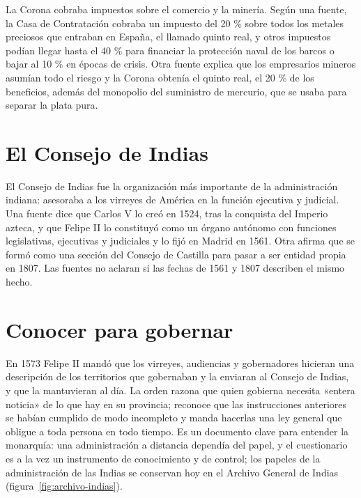 \documentclass{book}
\begin{document}

La Corona cobraba impuestos sobre el comercio y la minería. Según una fuente, la Casa de Contratación cobraba un impuesto del 20 \% sobre todos los metales preciosos que entraban en España, el llamado quinto real, y otros impuestos podían llegar hasta el 40 \% para financiar la protección naval de los barcos o bajar al 10 \% en épocas de crisis. Otra fuente explica que los empresarios mineros asumían todo el riesgo y la Corona obtenía el quinto real, el 20 \% de los beneficios, además del monopolio del suministro de mercurio, que se usaba para separar la plata pura.


\section{El Consejo de Indias}

El Consejo de Indias fue la organización más importante de la administración indiana: asesoraba a los virreyes de América en la función ejecutiva y judicial. Una fuente dice que Carlos V lo creó en 1524, tras la conquista del Imperio azteca, y que Felipe II lo constituyó como un órgano autónomo con funciones legislativas, ejecutivas y judiciales y lo fijó en Madrid en 1561. Otra afirma que se formó como una sección del Consejo de Castilla para pasar a ser entidad propia en 1807. Las fuentes no aclaran si las fechas de 1561 y 1807 describen el mismo hecho.


\section{Conocer para gobernar}

En 1573 Felipe II mandó que los virreyes, audiencias y gobernadores hicieran una descripción de los territorios que gobernaban y la enviaran al Consejo de Indias, y que la mantuvieran al día. La orden razona que quien gobierna necesita «entera noticia» de lo que hay en su provincia; reconoce que las instrucciones anteriores se habían cumplido de modo incompleto y manda hacerlas una ley general que obligue a toda persona en todo tiempo. Es un documento clave para entender la monarquía: una administración a distancia dependía del papel, y el cuestionario es a la vez un instrumento de conocimiento y de control; los papeles de la administración de las Indias se conservan hoy en el Archivo General de Indias (figura~\ref{fig:archivo-indias}).
\end{document}
